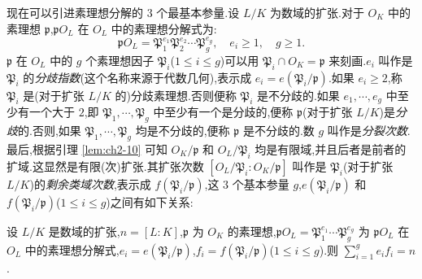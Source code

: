 现在可以引进素理想分解的 $3$ 个最基本参量.设 $L/K$ 为数域的扩张.对于 $O_K$ 中的素理想 $\mathfrak{p}$,$\mathfrak{p}O_L$ 在 $O_L$ 中的素理想分解式为:
\[
  \mathfrak{p}O_L=\mathfrak{P}_1^{e_1}\mathfrak{P}_2^{e_2}\cdots\mathfrak{P}_g^{e_g},\quad e_i\geqslant 1,\quad g\geqslant 1.
\]
$\mathfrak{p}$ 在 $O_L$ 中的 $g$ 个素理想因子 $\mathfrak{P}_i$($1\leqslant i\leqslant g$)可以用 $\mathfrak{P}_i\cap O_K=\mathfrak{p}$ 来刻画.$e_i$ 叫作是 $\mathfrak{P}_i$ 的\emph{分歧指数}(这个名称来源于代数几何),表示成 $e_i=e(\mathfrak{P}_i/\mathfrak{p})$.如果 $e_i\geqslant 2$,称 $\mathfrak{P}_i$ 是(对于扩张 $L/K$ 的)分歧素理想.否则便称 $\mathfrak{P}_i$ 是不分歧的.如果 $e_1,\cdots,e_g$ 中至少有一个大于 $2$,即 $\mathfrak{P}_1,\cdots,\mathfrak{P}_g$ 中至少有一个是分歧的,便称 $\mathfrak{p}$(对于扩张 $L/K$)是\emph{分歧}的.否则,如果 $\mathfrak{P}_1,\cdots,\mathfrak{P}_g$ 均是不分歧的,便称 $\mathfrak{p}$ 是不分歧的.数 $g$ 叫作是\emph{分裂次数}.最后,根据引理 \ref{lem:ch2-10} 可知 $O_K/\mathfrak{p}$ 和 $O_L/\mathfrak{P}_i$ 均是有限域,并且后者是前者的扩域.这显然是有限(次)扩张.其扩张次数 $[O_L/\mathfrak{P}_i:O_K/\mathfrak{p}]$ 叫作是 $\mathfrak{P}_i$(对于扩张 $L/K$)的\emph{剩余类域次数},表示成 $f(\mathfrak{P}_i/\mathfrak{p})$,这 $3$ 个基本参量 $g$,$e(\mathfrak{P}_i/\mathfrak{p})$ 和 $f(\mathfrak{P}_i/\mathfrak{p})$($1\leqslant i\leqslant g$)之间有如下关系:

\begin{theorem}\label{thm:2.5}
设 $L/K$ 是数域的扩张,$n=[L:K]$,$\mathfrak{p}$ 为 $O_K$ 的素理想,$\mathfrak{p}O_L=\mathfrak{P}_1^{e_1}\cdots\mathfrak{P}_g^{e_g}$ 为 $\mathfrak{p}O_L$ 在 $O_L$ 中的素理想分解式,$e_i=e(\mathfrak{P}_i/\mathfrak{p})$,$f_i=f(\mathfrak{P}_i/\mathfrak{p})$($1\leqslant i\leqslant g$).则 $\sum_{i=1}^{g}e_if_i=n$.
\end{theorem}

